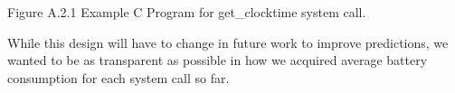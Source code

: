 \documentclass[11pt]{article}
\begin{document}
{\fontsize{11}{13}\selectfont Figure A.2.1 Example C Program for get\_clocktime system call.}
\newline

While this design will have to change in future work to improve predictions, we wanted to be as transparent as 
possible in how we acquired average battery consumption for each system call so far.
\end{document}
